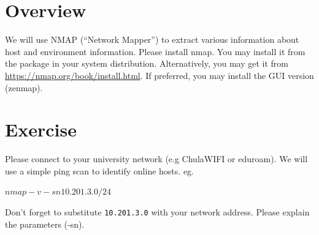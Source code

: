 \documentclass[a4paper, 10pt]{article}
\begin{document}
\subject
{}

\section{Overview}

We will use NMAP (``Network Mapper'') to extract various information about host and environment information.
Please install nmap.
You may install it from the package in your system distribution.
Alternatively, you may get it from \url{https://nmap.org/book/install.html}.
If preferred, you may install the GUI version (zenmap).

\section{Exercise}

\begin{problem}
Please connect to your university network (e.g ChulaWIFI or eduroam).
We will use a simple ping scan to identify online hosts. eg.
\begin{codingbox}
$ nmap -v -sn 10.201.3.0/24
$
\end{codingbox}

\noindent Don't forget to substitute \texttt{10.201.3.0} with your network address.
Please explain the parameters (-sn).
\end{problem}
\end{document}
